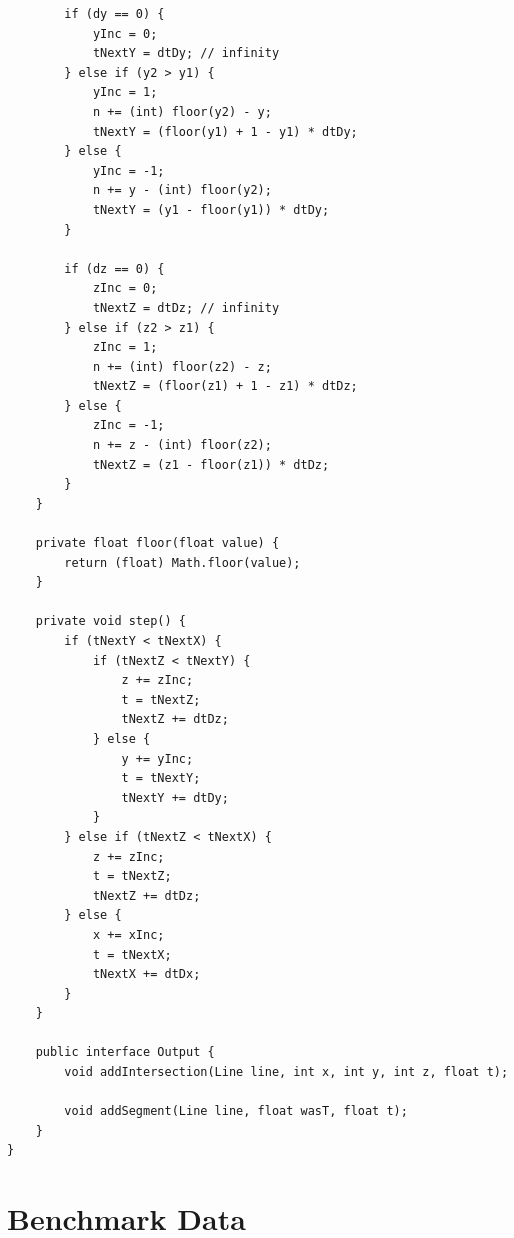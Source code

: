 \documentclass[11pt,twoside,a4paper]{report}
\begin{document}
\begin{lstlisting}
        if (dy == 0) {
            yInc = 0;
            tNextY = dtDy; // infinity
        } else if (y2 > y1) {
            yInc = 1;
            n += (int) floor(y2) - y;
            tNextY = (floor(y1) + 1 - y1) * dtDy;
        } else {
            yInc = -1;
            n += y - (int) floor(y2);
            tNextY = (y1 - floor(y1)) * dtDy;
        }

        if (dz == 0) {
            zInc = 0;
            tNextZ = dtDz; // infinity
        } else if (z2 > z1) {
            zInc = 1;
            n += (int) floor(z2) - z;
            tNextZ = (floor(z1) + 1 - z1) * dtDz;
        } else {
            zInc = -1;
            n += z - (int) floor(z2);
            tNextZ = (z1 - floor(z1)) * dtDz;
        }
    }

    private float floor(float value) {
        return (float) Math.floor(value);
    }

    private void step() {
        if (tNextY < tNextX) {
            if (tNextZ < tNextY) {
                z += zInc;
                t = tNextZ;
                tNextZ += dtDz;
            } else {
                y += yInc;
                t = tNextY;
                tNextY += dtDy;
            }
        } else if (tNextZ < tNextX) {
            z += zInc;
            t = tNextZ;
            tNextZ += dtDz;
        } else {
            x += xInc;
            t = tNextX;
            tNextX += dtDx;
        }
    }

    public interface Output {
        void addIntersection(Line line, int x, int y, int z, float t);

        void addSegment(Line line, float wasT, float t);
    }
}
\end{lstlisting}

\chapter{Benchmark Data}
\end{document}
